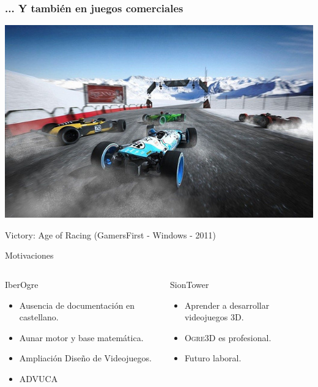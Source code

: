 \documentclass[green]{beamer}
\begin{document}
\begin{frame}
    \frametitle{... Y también en juegos comerciales}
    \begin{center}
	\includegraphics[scale=0.4]{img/victory.jpg}
	    
	\tiny{Victory: Age of Racing (GamersFirst - Windows - 2011)}
    \end{center}
\end{frame}


\begin{frame}{Motivaciones}
    \begin{columns}[t]
    
    \column{150px}
	\begin{block}{IberOgre}
	    \begin{itemize}
		\item Ausencia de documentación en castellano.
		\item Aunar motor y base matemática.
		\item Ampliación Diseño de Videojuegos.
		\item ADVUCA
	    \end{itemize}
	\end{block}
	
    \column{150px}
	\begin{block}{SionTower}
	    \begin{itemize}
		\item Aprender a desarrollar videojuegos 3D.
		\item \textsc{Ogre3D} es profesional.
		\item Futuro laboral.
	    \end{itemize}
	\end{block}
    
    \end{columns}
\end{frame}
\end{document}

